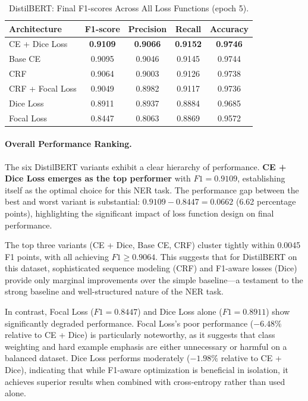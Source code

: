 \begin{table}[htbp]
\centering
\caption{DistilBERT: Final F1-scores Across All Loss Functions (epoch 5).}
\begin{tabular}{lcccc}
\hline
\textbf{Architecture} & \textbf{F1-score} & \textbf{Precision} & \textbf{Recall} & \textbf{Accuracy} \\
\hline
CE + Dice Loss & \textbf{0.9109} & \textbf{0.9066} & \textbf{0.9152} & \textbf{0.9746} \\
Base CE & 0.9095 & 0.9046 & 0.9145 & 0.9744 \\
CRF & 0.9064 & 0.9003 & 0.9126 & 0.9738 \\
CRF + Focal Loss & 0.9049 & 0.8982 & 0.9117 & 0.9736 \\
Dice Loss & 0.8911 & 0.8937 & 0.8884 & 0.9685 \\
Focal Loss & 0.8447 & 0.8063 & 0.8869 & 0.9572 \\
\hline
\end{tabular}
\label{tab:distilbert_summary}
\end{table}

\paragraph{Overall Performance Ranking.}
The six DistilBERT variants exhibit a clear hierarchy of performance.
\textbf{CE + Dice Loss emerges as the top performer} with $F1 = 0.9109$, establishing itself as the optimal choice for this NER task.
The performance gap between the best and worst variant is substantial: $0.9109 - 0.8447 = 0.0662$ (6.62 percentage points), highlighting the significant impact of loss function design on final performance.

The top three variants (CE + Dice, Base CE, CRF) cluster tightly within 0.0045 F1 points, with all achieving $F1 \geq 0.9064$.
This suggests that for DistilBERT on this dataset, sophisticated sequence modeling (CRF) and F1-aware losses (Dice) provide only marginal improvements over the simple baseline—a testament to the strong baseline and well-structured nature of the NER task.

In contrast, Focal Loss ($F1 = 0.8447$) and Dice Loss alone ($F1 = 0.8911$) show significantly degraded performance.
Focal Loss's poor performance ($-6.48\%$ relative to CE + Dice) is particularly noteworthy, as it suggests that class weighting and hard example emphasis are either unnecessary or harmful on a balanced dataset.
Dice Loss performs moderately ($-1.98\%$ relative to CE + Dice), indicating that while F1-aware optimization is beneficial in isolation, it achieves superior results when combined with cross-entropy rather than used alone.

